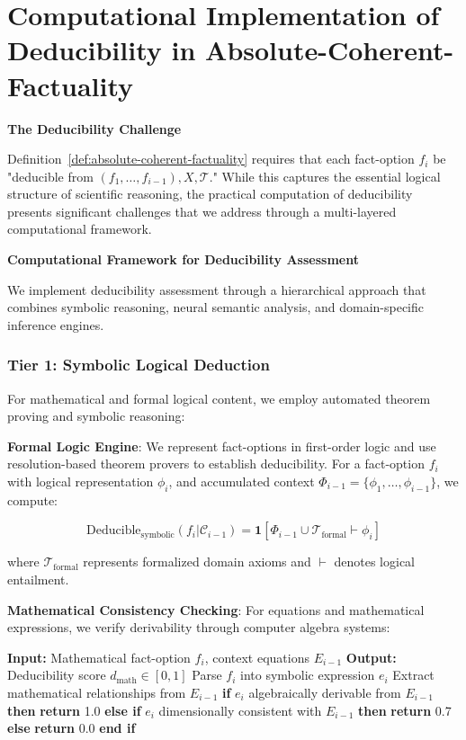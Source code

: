 \documentclass{uai2026} %
\theoremstyle{remark}
\theoremstyle{plain}
\theoremstyle{definition}
\begin{document}
\section{Computational Implementation of Deducibility in Absolute-Coherent-Factuality}
\label{app:deducibility-computation}

\textbf{The Deducibility Challenge}

Definition~\ref{def:absolute-coherent-factuality} requires that each fact-option $f_i$ be "deducible from $(f_1,\ldots,f_{i-1}), X, \mathcal{T}$." While this captures the essential logical structure of scientific reasoning, the practical computation of deducibility presents significant challenges that we address through a multi-layered computational framework.

\textbf{Computational Framework for Deducibility Assessment}

We implement deducibility assessment through a hierarchical approach that combines symbolic reasoning, neural semantic analysis, and domain-specific inference engines.

\subsubsection*{Tier 1: Symbolic Logical Deduction}

For mathematical and formal logical content, we employ automated theorem proving and symbolic reasoning:

\textbf{Formal Logic Engine}: We represent fact-options in first-order logic and use resolution-based theorem provers to establish deducibility. For a fact-option $f_i$ with logical representation $\phi_i$, and accumulated context $\Phi_{i-1} = \{\phi_1, \ldots, \phi_{i-1}\}$, we compute:

$$\text{Deducible}_{\text{symbolic}}(f_i | \mathcal{C}_{i-1}) = \mathbf{1}[\Phi_{i-1} \cup \mathcal{T}_{\text{formal}} \vdash \phi_i]$$

where $\mathcal{T}_{\text{formal}}$ represents formalized domain axioms and $\vdash$ denotes logical entailment.

\textbf{Mathematical Consistency Checking}: For equations and mathematical expressions, we verify derivability through computer algebra systems:

\begin{algorithm}[h]
\caption{Mathematical Deducibility Verification}
\label{alg:math-deducibility}
\begin{algorithmic}[1]
\STATE \textbf{Input:} Mathematical fact-option $f_i$, context equations $E_{i-1}$
\STATE \textbf{Output:} Deducibility score $d_{\text{math}} \in [0,1]$
\STATE Parse $f_i$ into symbolic expression $e_i$
\STATE Extract mathematical relationships from $E_{i-1}$
\STATE \textbf{if} $e_i$ algebraically derivable from $E_{i-1}$ \textbf{then}
\STATE \quad \textbf{return} 1.0
\STATE \textbf{else if} $e_i$ dimensionally consistent with $E_{i-1}$ \textbf{then}
\STATE \quad \textbf{return} 0.7
\STATE \textbf{else}
\STATE \quad \textbf{return} 0.0
\STATE \textbf{end if}
\end{algorithmic}
\end{algorithm}
\end{document}
